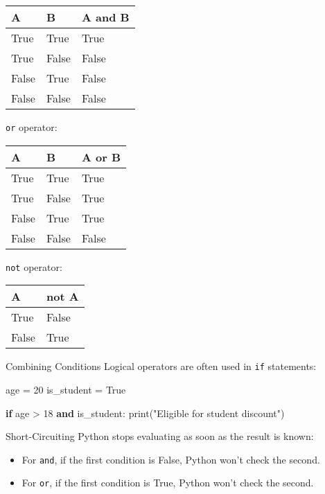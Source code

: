 \documentclass[
  letterpaper,
  DIV=11,
  numbers=noendperiod]{scrreprt}
\newenvironment{Shaded}{\begin{snugshade}}{\end{snugshade}}
\newcommand{\BuiltInTok}[1]{\textcolor[rgb]{0.00,0.23,0.31}{#1}}
\newcommand{\ControlFlowTok}[1]{\textcolor[rgb]{0.00,0.23,0.31}{\textbf{#1}}}
\newcommand{\DecValTok}[1]{\textcolor[rgb]{0.68,0.00,0.00}{#1}}
\newcommand{\KeywordTok}[1]{\textcolor[rgb]{0.00,0.23,0.31}{\textbf{#1}}}
\newcommand{\NormalTok}[1]{\textcolor[rgb]{0.00,0.23,0.31}{#1}}
\newcommand{\OperatorTok}[1]{\textcolor[rgb]{0.37,0.37,0.37}{#1}}
\newcommand{\StringTok}[1]{\textcolor[rgb]{0.13,0.47,0.30}{#1}}
\newcommand{\VariableTok}[1]{\textcolor[rgb]{0.07,0.07,0.07}{#1}}
\providecommand{\tightlist}{%
  \setlength{\itemsep}{0pt}\setlength{\parskip}{0pt}}
\begin{document}
\begin{longtable}[]{@{}lll@{}}
\toprule\noalign{}
A & B & A and B \\
\midrule\noalign{}
\endhead
\bottomrule\noalign{}
\endlastfoot
True & True & True \\
True & False & False \\
False & True & False \\
False & False & False \\
\end{longtable}

\texttt{or} operator:

\begin{longtable}[]{@{}lll@{}}
\toprule\noalign{}
A & B & A or B \\
\midrule\noalign{}
\endhead
\bottomrule\noalign{}
\endlastfoot
True & True & True \\
True & False & True \\
False & True & True \\
False & False & False \\
\end{longtable}

\texttt{not} operator:

\begin{longtable}[]{@{}ll@{}}
\toprule\noalign{}
A & not A \\
\midrule\noalign{}
\endhead
\bottomrule\noalign{}
\endlastfoot
True & False \\
False & True \\
\end{longtable}

Combining Conditions Logical operators are often used in \texttt{if}
statements:

\begin{Shaded}
\begin{Highlighting}[]
\NormalTok{age }\OperatorTok{=} \DecValTok{20}
\NormalTok{is\_student }\OperatorTok{=} \VariableTok{True}

\ControlFlowTok{if}\NormalTok{ age }\OperatorTok{\textgreater{}} \DecValTok{18} \KeywordTok{and}\NormalTok{ is\_student:}
    \BuiltInTok{print}\NormalTok{(}\StringTok{"Eligible for student discount"}\NormalTok{)}
\end{Highlighting}
\end{Shaded}

Short-Circuiting Python stops evaluating as soon as the result is known:

\begin{itemize}
\tightlist
\item
  For \texttt{and}, if the first condition is False, Python won't check
  the second.
\item
  For \texttt{or}, if the first condition is True, Python won't check
  the second.
\end{itemize}
\end{document}
